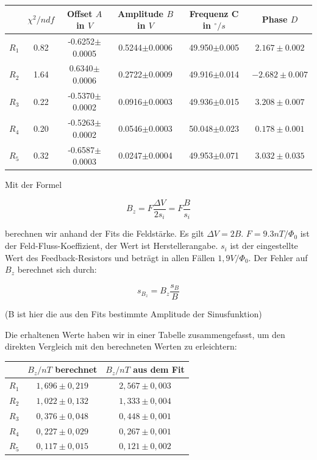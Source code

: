 \begin{tabular}[H]{| c | c | c | c | c | c |} \hline
 & $\chi^2 / ndf$ & Offset $A$ in $V$ & Amplitude $B$ in $V$ & Frequenz C in $^\circ/s$ & Phase $D$ \\ 
\hline
$R_1$ & 0.82 & -0.6252$\pm$0.0005 & 0.5244$\pm$0.0006 & 49.950$\pm$0.005 & $2.167 \pm 0.002$\\
$R_2$ & 1.64 & 0.6340$\pm$0.0006 & 0.2722$\pm$0.0009 & 49.916$\pm$0.014 & $-2.682 \pm 0.007$\\
$R_3$ & 0.22 & -0.5370$\pm$0.0002 & 0.0916$\pm$0.0003 & 49.936$\pm$0.015 & $3.208 \pm 0.007$\\
$R_4$ & 0.20 & -0.5263$\pm$0.0002 & 0.0546$\pm$0.0003 & 50.048$\pm$0.023 & $0.178 \pm 0.001$\\
$R_5$ & 0.32 & -0.6587$\pm$0.0003 & 0.0247$\pm$0.0004 & 49.953$\pm$0.071 & $3.032 \pm 0.035$\\ \hline
\end{tabular}

Mit der Formel 

$$ B_z = F \frac{\Delta V}{2s_i} = F\frac{B}{s_i} $$

berechnen wir anhand der Fits die Feldstärke. Es gilt $\Delta V = 2B$. $F = 9.3 nT / \Phi_0$ ist der Feld-Fluss-Koeffizient, der Wert ist Herstellerangabe. $s_i$ ist der eingestellte Wert des Feedback-Resistors und beträgt in allen Fällen $1,9 V/ \Phi_0$. Der Fehler auf $B_z$ berechnet sich durch:

$$ s_{B_z} = B_z\frac{s_B}{B} $$

(B ist hier die aus den Fits bestimmte Amplitude der Sinusfunktion)
 
Die erhaltenen Werte haben wir in einer Tabelle zusammengefasst, um den direkten Vergleich mit den berechneten Werten zu erleichtern:

\begin{center}
\begin{tabular}[H]{| c | c | c |} \hline
 & $B_z / nT$ berechnet & $B_z / nT$ aus dem Fit\\ \hline \hline
 $R_1$ & $1,696 \pm 0,219$ & $2,567\pm 0,003$\\
 $R_2$ & $1,022 \pm 0,132$ & $1,333\pm 0,004$\\
 $R_3$ & $0,376 \pm 0,048$ & $0,448\pm 0,001$\\
 $R_4$ & $0,227 \pm 0,029$ & $0,267\pm 0,001$\\
 $R_5$ & $0,117 \pm 0,015$ & $0,121\pm 0,002$\\ \hline
 \end{tabular}
 \end{center}
 
